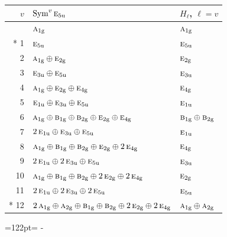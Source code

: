 \documentclass[10pt,a4paper]{article}
\newcommand{\needspace}[1]{\par\penalty-100\begingroup\dimen0=#1\relax\dimen2=\pagegoal
  \advance\dimen2-\pagetotal\ifdim\dimen0>\dimen2\relax\ifdim\dimen2>0pt\vfil\break\fi\fi
  \endgroup}
\numberwithin{equation}{section}
\newcommand{\irr}[1]{\text{\normalfont\scshape #1}}
\newcommand{\ptag}[1]{\mathrm{#1}}
\begin{document}
{\small\begin{longtable}{@{}rll@{}}\toprule
$v$ & $\operatorname{Sym}^{v}\irr{e}_{5\ptag{u}}$ & $H_\ell$, $\ell = v$\\\midrule\endhead
\bottomrule\endfoot\endlastfoot
0 & $\irr{a}_{1\ptag{g}}$ & $\irr{a}_{1\ptag{g}}$\\*
1 & $\irr{e}_{5\ptag{u}}$ & $\irr{e}_{5\ptag{u}}$\\
2 & $\irr{a}_{1\ptag{g}} \oplus \irr{e}_{2\ptag{g}}$ & $\irr{e}_{2\ptag{g}}$\\
3 & $\irr{e}_{3\ptag{u}} \oplus \irr{e}_{5\ptag{u}}$ & $\irr{e}_{3\ptag{u}}$\\
4 & $\irr{a}_{1\ptag{g}} \oplus \irr{e}_{2\ptag{g}} \oplus \irr{e}_{4\ptag{g}}$ & $\irr{e}_{4\ptag{g}}$\\
5 & $\irr{e}_{1\ptag{u}} \oplus \irr{e}_{3\ptag{u}} \oplus \irr{e}_{5\ptag{u}}$ & $\irr{e}_{1\ptag{u}}$\\
6 & $\irr{a}_{1\ptag{g}} \oplus \irr{b}_{1\ptag{g}} \oplus \irr{b}_{2\ptag{g}} \oplus \irr{e}_{2\ptag{g}} \oplus \irr{e}_{4\ptag{g}}$ & $\irr{b}_{1\ptag{g}} \oplus \irr{b}_{2\ptag{g}}$\\
7 & $2\,\irr{e}_{1\ptag{u}} \oplus \irr{e}_{3\ptag{u}} \oplus \irr{e}_{5\ptag{u}}$ & $\irr{e}_{1\ptag{u}}$\\
8 & $\irr{a}_{1\ptag{g}} \oplus \irr{b}_{1\ptag{g}} \oplus \irr{b}_{2\ptag{g}} \oplus \irr{e}_{2\ptag{g}} \oplus 2\,\irr{e}_{4\ptag{g}}$ & $\irr{e}_{4\ptag{g}}$\\
9 & $2\,\irr{e}_{1\ptag{u}} \oplus 2\,\irr{e}_{3\ptag{u}} \oplus \irr{e}_{5\ptag{u}}$ & $\irr{e}_{3\ptag{u}}$\\
10 & $\irr{a}_{1\ptag{g}} \oplus \irr{b}_{1\ptag{g}} \oplus \irr{b}_{2\ptag{g}} \oplus 2\,\irr{e}_{2\ptag{g}} \oplus 2\,\irr{e}_{4\ptag{g}}$ & $\irr{e}_{2\ptag{g}}$\\
11 & $2\,\irr{e}_{1\ptag{u}} \oplus 2\,\irr{e}_{3\ptag{u}} \oplus 2\,\irr{e}_{5\ptag{u}}$ & $\irr{e}_{5\ptag{u}}$\\*
12 & $2\,\irr{a}_{1\ptag{g}} \oplus \irr{a}_{2\ptag{g}} \oplus \irr{b}_{1\ptag{g}} \oplus \irr{b}_{2\ptag{g}} \oplus 2\,\irr{e}_{2\ptag{g}} \oplus 2\,\irr{e}_{4\ptag{g}}$ & $\irr{a}_{1\ptag{g}} \oplus \irr{a}_{2\ptag{g}}$\\
\bottomrule\end{longtable}}
\needspace{122pt}
\end{document}
